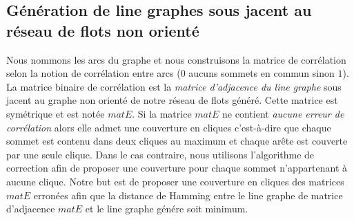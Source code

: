 \documentclass[onecolumn, 12pt]{book}
\begin{document}
\subsection{G\'en\'eration de line graphes sous jacent au r\'eseau de flots non orient\'e}
Nous nommons les arcs du graphe et nous construisons la matrice de corr\'elation selon la notion de corr\'elation entre arcs ($0$ aucuns sommets en commun sinon $1$).
La matrice binaire de corr\'elation est la {\em matrice d'adjacence du line graphe} sous jacent au graphe non orient\'e de notre r\'eseau de flots g\'en\'er\'e. Cette matrice est sym\'etrique et est not\'ee $matE$. \newline
Si la matrice $matE$ ne contient {\em aucune erreur de corr\'elation} alors elle admet une couverture en cliques c'est-\`a-dire que chaque sommet est contenu dans deux cliques au maximum et chaque ar\^ete est couverte par une seule clique.
Dans le cas contraire, nous utilisons l'algorithme de correction afin de proposer une couverture pour chaque sommet n'appartenant \`a aucune clique. 
\newline
Notre but est de proposer une couverture en cliques des matrices $matE$ erron\'ees afin que 
la distance de Hamming entre le line graphe de matrice d'adjacence $matE$ et le line graphe g\'en\'ere soit minimum. 
\end{document}
